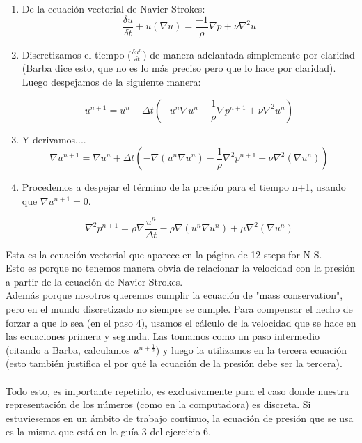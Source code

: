 \documentclass[a4paper]{article}
\begin{document}
\begin{enumerate}
\item De la ecuación vectorial de Navier-Strokes:
	$$ \frac{\delta u}{\delta t} + u(\nabla u) = \frac{-1}{\rho} \nabla p + \nu \nabla^{2}u$$

\item Discretizamos el tiempo ($\frac{\delta u^{n}}{\delta t}$) de manera adelantada simplemente por claridad (Barba dice esto, que no es lo más preciso pero que lo hace por claridad). Luego despejamos de la siguiente manera:

	$$u^{n+1} = u^{n} + \Delta t\left(-u^{n}\nabla u^{n} - \frac{1}{\rho}\nabla p^{n+1} + \nu\nabla^{2}u^{n}\right)$$ 

\item Y derivamos....
	$$\nabla u^{n+1} = \nabla u^{n} + \Delta t\left(-\nabla(u^{n}\nabla u^{n}) - \frac{1}{\rho}\nabla^{2} p^{n+1} + \nu\nabla^{2}(\nabla u^{n})\right)$$ 

\item Procedemos a despejar el término de la presión para el tiempo n+1, usando que $\nabla u^{n+1} = 0$.

	$$ \nabla^{2}p^{n+1} = \rho\nabla\frac{u^{n}}{\Delta t} - \rho\nabla\left(u^{n}\nabla u^{n}\right) + \mu\nabla^{2}\left(\nabla u^{n}\right)$$

\end{enumerate}

Esta es la ecuación vectorial que aparece en la página de 12 steps for N-S.\\
Esto es porque no tenemos manera obvia de relacionar la velocidad con la presión a partir de la ecuación de Navier Strokes.\\
Además porque nosotros queremos cumplir la ecuación de "mass conservation", pero en el mundo discretizado no siempre se cumple. Para compensar el hecho de forzar a que lo sea (en el paso 4), usamos el cálculo de la velocidad que se hace en las ecuaciones primera y segunda. Las tomamos como un paso intermedio (citando a Barba, calculamos $u^{n+\frac{1}{2}}$) y luego la utilizamos en la tercera ecuación (esto también justifica el por qué la ecuación de la presión debe ser la tercera).\\

~\\

Todo esto, es importante repetirlo, es exclusivamente para el caso donde nuestra representación de los números (como en la computadora) es discreta. Si estuviesemos en un ámbito de trabajo continuo, la ecuación de presión que se usa es la misma que está en la guía 3 del ejercicio 6.
\end{document}

